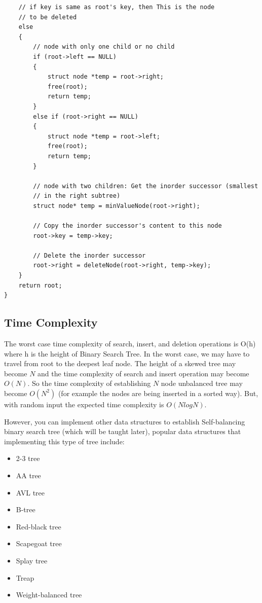 \documentclass[12pt]{article}
\begin{document}
\begin{verbatim}
    // if key is same as root's key, then This is the node 
    // to be deleted 
    else
    { 
        // node with only one child or no child 
        if (root->left == NULL) 
        { 
            struct node *temp = root->right; 
            free(root); 
            return temp; 
        } 
        else if (root->right == NULL) 
        { 
            struct node *temp = root->left; 
            free(root); 
            return temp; 
        } 
  
        // node with two children: Get the inorder successor (smallest 
        // in the right subtree) 
        struct node* temp = minValueNode(root->right); 
  
        // Copy the inorder successor's content to this node 
        root->key = temp->key; 
  
        // Delete the inorder successor 
        root->right = deleteNode(root->right, temp->key); 
    } 
    return root; 
} 

\end{verbatim}

\subsection{Time Complexity}
The worst case time complexity of search, insert, and deletion operations is O(h) where h is the height of Binary Search Tree. In the worst case, we may have to travel from root to the deepest leaf node. The height of a skewed tree may become $N$ and the time complexity of search and insert operation may become $O(N)$. So the time complexity of establishing $N$ node unbalanced tree may become $O(N^2)$ (for example the nodes are being inserted in a sorted way). But, with random input the  expected time complexity is $O(NlogN)$.

    However, you can implement other data structures to establish Self-balancing binary search tree (which will be taught later), popular data structures that implementing this type of tree include:
    \begin{itemize}
        \item 2-3 tree
        \item AA tree
        \item AVL tree
        \item B-tree
        \item Red-black tree
        \item Scapegoat tree
        \item Splay tree
        \item Treap
        \item Weight-balanced tree
    \end{itemize}
\end{document}
